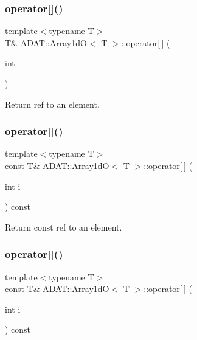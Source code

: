 \subsubsection{\texorpdfstring{operator[]()}{operator[]()}\hspace{0.1cm}{\footnotesize\ttfamily [3/6]}}
{\footnotesize\ttfamily template$<$typename T$>$ \\
T\& \mbox{\hyperlink{classADAT_1_1Array1dO}{A\+D\+A\+T\+::\+Array1dO}}$<$ T $>$\+::operator\mbox{[}$\,$\mbox{]} (\begin{DoxyParamCaption}\item[{int}]{i }\end{DoxyParamCaption})\hspace{0.3cm}{\ttfamily [inline]}}



Return ref to an element. 

\mbox{\label{classADAT_1_1Array1dO_a48b2dbd0a7e4ee5dce18a12ca19d78be}} 
\subsubsection{\texorpdfstring{operator[]()}{operator[]()}\hspace{0.1cm}{\footnotesize\ttfamily [4/6]}}
{\footnotesize\ttfamily template$<$typename T$>$ \\
const T\& \mbox{\hyperlink{classADAT_1_1Array1dO}{A\+D\+A\+T\+::\+Array1dO}}$<$ T $>$\+::operator\mbox{[}$\,$\mbox{]} (\begin{DoxyParamCaption}\item[{int}]{i }\end{DoxyParamCaption}) const\hspace{0.3cm}{\ttfamily [inline]}}



Return const ref to an element. 

\mbox{\label{classADAT_1_1Array1dO_a48b2dbd0a7e4ee5dce18a12ca19d78be}} 
\subsubsection{\texorpdfstring{operator[]()}{operator[]()}\hspace{0.1cm}{\footnotesize\ttfamily [5/6]}}
{\footnotesize\ttfamily template$<$typename T$>$ \\
const T\& \mbox{\hyperlink{classADAT_1_1Array1dO}{A\+D\+A\+T\+::\+Array1dO}}$<$ T $>$\+::operator\mbox{[}$\,$\mbox{]} (\begin{DoxyParamCaption}\item[{int}]{i }\end{DoxyParamCaption}) const\hspace{0.3cm}{\ttfamily [inline]}}



